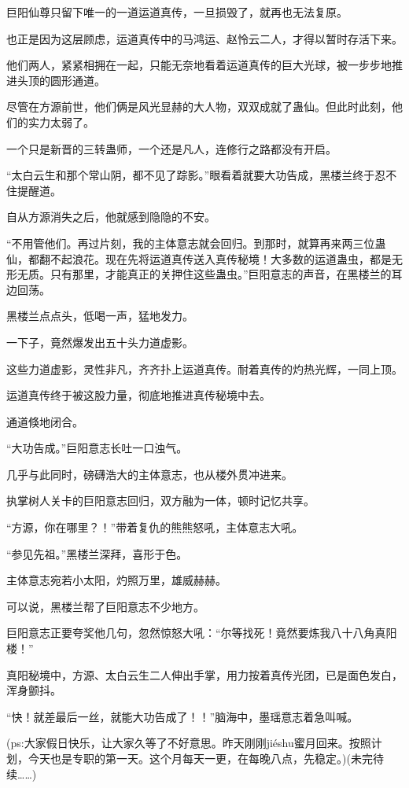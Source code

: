 \begin{this_body}
巨阳仙尊只留下唯一的一道运道真传，一旦损毁了，就再也无法复原。

也正是因为这层顾虑，运道真传中的马鸿运、赵怜云二人，才得以暂时存活下来。

他们两人，紧紧相拥在一起，只能无奈地看着运道真传的巨大光球，被一步步地推进头顶的圆形通道。

尽管在方源前世，他们俩是风光显赫的大人物，双双成就了蛊仙。但此时此刻，他们的实力太弱了。

一个只是新晋的三转蛊师，一个还是凡人，连修行之路都没有开启。

“太白云生和那个常山阴，都不见了踪影。”眼看着就要大功告成，黑楼兰终于忍不住提醒道。

自从方源消失之后，他就感到隐隐的不安。

“不用管他们。再过片刻，我的主体意志就会回归。到那时，就算再来两三位蛊仙，都翻不起浪花。现在先将运道真传送入真传秘境！大多数的运道蛊虫，都是无形无质。只有那里，才能真正的关押住这些蛊虫。”巨阳意志的声音，在黑楼兰的耳边回荡。

黑楼兰点点头，低喝一声，猛地发力。

一下子，竟然爆发出五十头力道虚影。

这些力道虚影，灵性非凡，齐齐扑上运道真传。耐着真传的灼热光辉，一同上顶。

运道真传终于被这股力量，彻底地推进真传秘境中去。

通道倏地闭合。

“大功告成。”巨阳意志长吐一口浊气。

几乎与此同时，磅礴浩大的主体意志，也从楼外贯冲进来。

执掌树人关卡的巨阳意志回归，双方融为一体，顿时记忆共享。

“方源，你在哪里？！”带着复仇的熊熊怒吼，主体意志大吼。

“参见先祖。”黑楼兰深拜，喜形于色。

主体意志宛若小太阳，灼照万里，雄威赫赫。

可以说，黑楼兰帮了巨阳意志不少地方。

巨阳意志正要夸奖他几句，忽然惊怒大吼：“尔等找死！竟然要炼我八十八角真阳楼！”

真阳秘境中，方源、太白云生二人伸出手掌，用力按着真传光团，已是面色发白，浑身颤抖。

“快！就差最后一丝，就能大功告成了！！”脑海中，墨瑶意志着急叫喊。

(ps:大家假日快乐，让大家久等了不好意思。昨天刚刚jiéshu蜜月回来。按照计划，今天也是专职的第一天。这个月每天一更，在每晚八点，先稳定。)(未完待续……)

\end{this_body}

